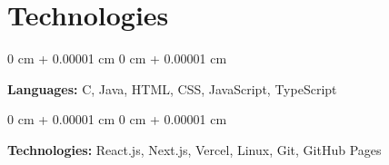 \documentclass[10pt, letterpaper]{article}
\newenvironment{onecolentry}{
    \begin{adjustwidth}{
        0 cm + 0.00001 cm
    }{
        0 cm + 0.00001 cm
    }
}{
    \end{adjustwidth}
} %
\begin{document}
    
    \section{Technologies}

        \begin{onecolentry}
            \textbf{Languages:} C, Java, HTML, CSS, JavaScript, TypeScript
        \end{onecolentry}

        \vspace{0.2 cm}

        \begin{onecolentry}
            \textbf{Technologies:} React.js, Next.js, Vercel, Linux, Git, GitHub Pages
        \end{onecolentry}


    
\end{document}
